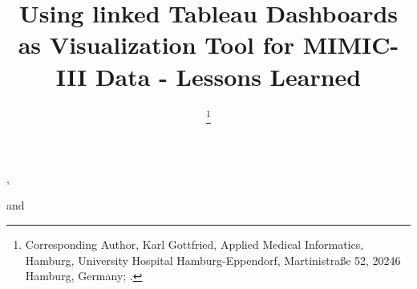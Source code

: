 \documentclass[aac,crcready]{iosart2x}
\begin{document}
\begin{frontmatter}

{\centering \title{Using linked Tableau Dashboards as Visualization Tool for MIMIC-III Data - Lessons Learned
}}


\author[A]{ %
\thanks{Corresponding Author, Karl Gottfried, Applied Medical Informatics, Hamburg, University Hospital Hamburg-Eppendorf, Martinistraße 52, 20246 Hamburg, Germany;  .}},
\author[A]{ }
and
\author[A]{ }
\address[A]{Applied Medical Informatics, , Germany, ,
}
\address[B]{Department first, ,
Abbreviate US states, }



\end{frontmatter}
\end{document}
